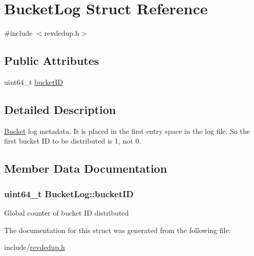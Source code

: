 \hypertarget{structBucketLog}{\section{\-Bucket\-Log \-Struct \-Reference}
\label{structBucketLog}
}


{\ttfamily \#include $<$revdedup.\-h$>$}

\subsection*{\-Public \-Attributes}
\begin{DoxyCompactItemize}
\item 
uint64\-\_\-t \hyperlink{structBucketLog_a9f9326f084e4c1d5ee6d1150cf629911}{bucket\-I\-D}
\end{DoxyCompactItemize}


\subsection{\-Detailed \-Description}
\hyperlink{structBucket}{\-Bucket} log metadata. \-It is placed in the first entry space in the log file. \-So the first bucket \-I\-D to be distributed is 1, not 0. 

\subsection{\-Member \-Data \-Documentation}
\hypertarget{structBucketLog_a9f9326f084e4c1d5ee6d1150cf629911}{
\subsubsection[{bucket\-I\-D}]{\setlength{\rightskip}{0pt plus 5cm}uint64\-\_\-t {\bf \-Bucket\-Log\-::bucket\-I\-D}}}\label{structBucketLog_a9f9326f084e4c1d5ee6d1150cf629911}
\-Global counter of bucket \-I\-D distributed 

\-The documentation for this struct was generated from the following file\-:\begin{DoxyCompactItemize}
\item 
include/\hyperlink{revdedup_8h}{revdedup.\-h}\end{DoxyCompactItemize}
